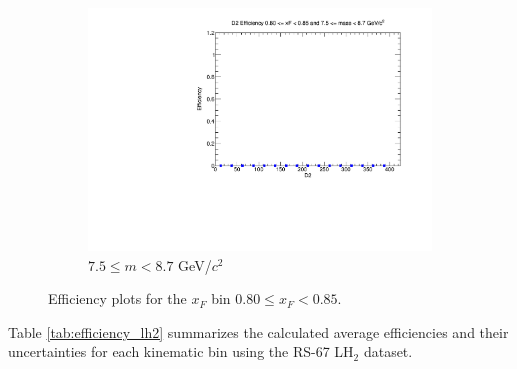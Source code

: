 \documentclass[11pt]{article}
\begin{document}
\begin{figure}[p]
\begin{subfigure}[b]{0.32\textwidth}
        \includegraphics[width=\textwidth]{./kTrackerEfficiencyPlots/D2_Efficiency_xF16_mass10.pdf}
        \caption{$7.5 \leq m < 8.7$ GeV/$c^2$}
    \end{subfigure}
    \caption{Efficiency plots for the $x_F$ bin $0.80 \leq x_F < 0.85$.}
\end{figure}

\clearpage
\FloatBarrier

Table \ref{tab:efficiency_lh2} summarizes the calculated average efficiencies and their uncertainties for each kinematic bin using the RS-67 LH$_2$ dataset.
\end{document}
